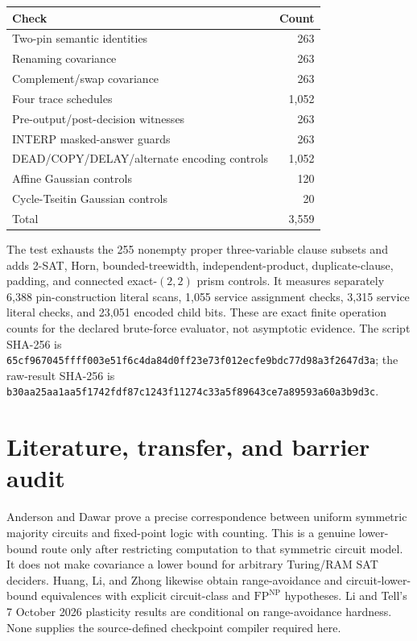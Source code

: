 \documentclass[11pt]{article}
\begin{document}
\begin{center}
\begin{tabular}{lr}
\toprule
Check & Count\\
\midrule
Two-pin semantic identities & 263\\
Renaming covariance & 263\\
Complement/swap covariance & 263\\
Four trace schedules & 1,052\\
Pre-output/post-decision witnesses & 263\\
INTERP masked-answer guards & 263\\
DEAD/COPY/DELAY/alternate encoding controls & 1,052\\
Affine Gaussian controls & 120\\
Cycle-Tseitin Gaussian controls & 20\\
\midrule
Total & 3,559\\
\bottomrule
\end{tabular}
\end{center}

The test exhausts the 255 nonempty proper three-variable clause subsets and
adds 2-SAT, Horn, bounded-treewidth, independent-product, duplicate-clause,
padding, and connected exact-$(2,2)$ prism controls.  It measures separately
6,388 pin-construction literal scans, 1,055 service assignment checks, 3,315
service literal checks, and 23,051 encoded child bits.  These are exact finite
operation counts for the declared brute-force evaluator, not asymptotic
evidence.  The script SHA-256 is
\nolinkurl{65cf967045ffff003e51f6c4da84d0ff23e73f012ecfe9bdc77d98a3f2647d3a};
the raw-result SHA-256 is
\nolinkurl{b30aa25aa1aa5f1742fdf87c1243f11274c33a5f89643ce7a89593a60a3b9d3c}.

\section{Literature, transfer, and barrier audit}

Anderson and Dawar prove a precise correspondence between uniform symmetric
majority circuits and fixed-point logic with counting.  This is a genuine
lower-bound route only after restricting computation to that symmetric
circuit model.  It does not make covariance a lower bound for arbitrary
Turing/RAM SAT deciders.  Huang, Li, and Zhong likewise obtain range-avoidance
and circuit-lower-bound equivalences with explicit circuit-class and
$\mathrm{FP}^{\mathrm{NP}}$ hypotheses.  Li and Tell's 7 October 2026
plasticity results are conditional on range-avoidance hardness.  None supplies
the source-defined checkpoint compiler required here.
\end{document}
